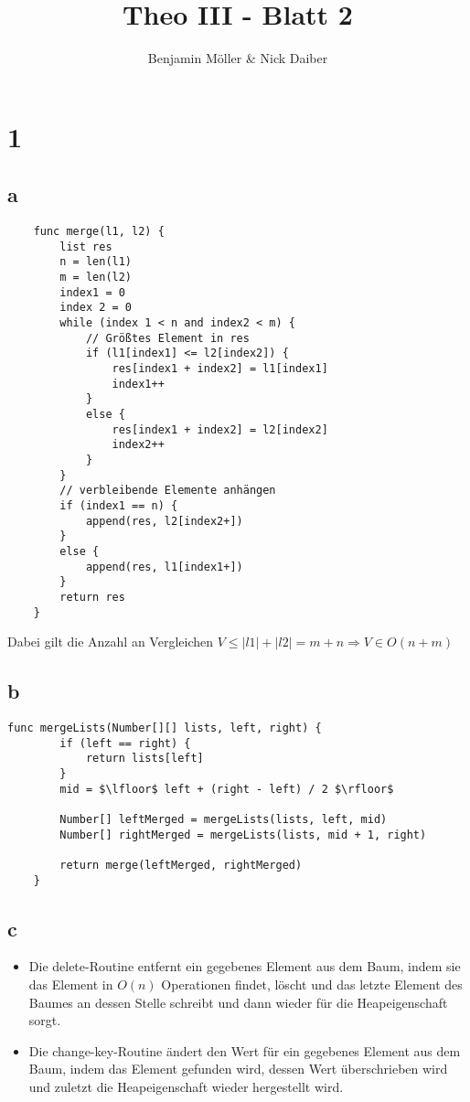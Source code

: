 \documentclass{article}
\title{Theo III - Blatt 2}
\author{Benjamin Möller \& Nick Daiber}
\begin{document}
\maketitle
\section*{1}
\subsection*{a}
\begin{verbatim}
    func merge(l1, l2) {
        list res
        n = len(l1)
        m = len(l2)
        index1 = 0
        index 2 = 0
        while (index 1 < n and index2 < m) {
            // Größtes Element in res
            if (l1[index1] <= l2[index2]) {
                res[index1 + index2] = l1[index1]
                index1++
            }
            else {
                res[index1 + index2] = l2[index2]
                index2++
            }
        }
        // verbleibende Elemente anhängen
        if (index1 == n) {
            append(res, l2[index2+])
        }
        else {
            append(res, l1[index1+])
        }
        return res
    }
\end{verbatim}

Dabei gilt die Anzahl an Vergleichen $V \leq |l1| + |l2| = m+n \Rightarrow V\in O(n+m)$
\newpage
\subsection*{b}
\begin{lstlisting}[mathescape=true]
    func mergeLists(Number[][] lists, left, right) {
        if (left == right) {
            return lists[left]
        }
        mid = $\lfloor$ left + (right - left) / 2 $\rfloor$

        Number[] leftMerged = mergeLists(lists, left, mid)
        Number[] rightMerged = mergeLists(lists, mid + 1, right)

        return merge(leftMerged, rightMerged)
    }
\end{lstlisting}
\subsection*{c}
\begin{itemize}
    \item {Die delete-Routine entfernt ein gegebenes Element aus dem Baum,
    indem sie das Element in $O(n)$ Operationen findet, löscht und das letzte Element des Baumes
    an dessen Stelle schreibt und dann wieder für die Heapeigenschaft sorgt.}
    \item {Die change-key-Routine ändert den Wert für ein gegebenes Element aus dem Baum,
    indem das Element gefunden wird, dessen Wert überschrieben wird und zuletzt die 
    Heapeigenschaft wieder hergestellt wird.}
\end{itemize}
\newpage
\end{document}
